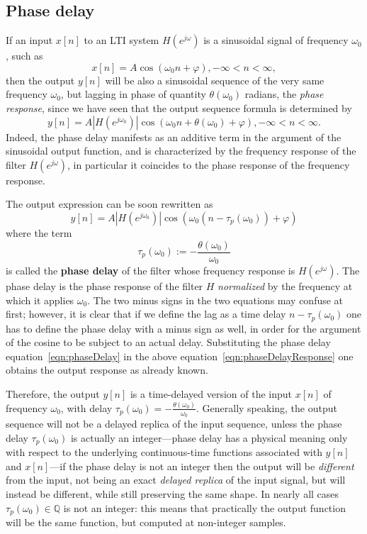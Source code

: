 \documentclass[\documentfontsize, twocolumn]{\classname}
\begin{document}
\subsection{Phase delay}

If an input $x[n]$ to an LTI system $H(e^{j\omega})$ is a sinusoidal signal of frequency $\omega_0$, such as
\[
    x[n] = A\cos{(\omega_0 n + \varphi)}, -\infty < n < \infty,
\]
then the output $y[n]$ will be also a sinusoidal sequence of the very same frequency $\omega_0$, but lagging in phase of quantity $\theta(\omega_0)$ radians, the \emph{phase response}, since we have seen that the output sequence formula is determined by
\[
    y[n] = A\left|H(e^{j\omega_0})\right| \cos{(\omega_0 n +\theta(\omega_0) + \varphi)}, -\infty < n < \infty.
\]
Indeed, the phase delay manifests as an additive term in the argument of the sinusoidal output function, and is characterized by the frequency response of the filter $H(e^{j\omega})$, in particular it coincides to the phase response of the frequency response.

The output expression can be soon rewritten as
\begin{equation}\label{eqn:phaseDelayResponse}
    y[n] = A\left|H(e^{j\omega_0})\right|\cos{\left(\omega_0\left(n - \tau_p(\omega_0)\right) + \varphi\right)}
\end{equation}
where the term
\begin{equation}\label{eqn:phaseDelay}
    \tau_p(\omega_0) :=
    -\frac {
        \theta(\omega_0)
    } {
        \omega_0
    }
\end{equation}
is called the \textbf{phase delay} of the filter whose frequency response is $H(e^{j\omega})$. The phase delay is the phase response of the filter $H$ \emph{normalized} by the frequency at which it applies $\omega_0$. The two minus signs in the two equations may confuse at first; however, it is clear that if we define the lag as a time delay $n - \tau_p(\omega_0)$ one has to define the phase delay with a minus sign as well, in order for the argument of the cosine to be subject to an actual delay. Substituting the phase delay equation~\ref{eqn:phaseDelay} in the above equation~\ref{eqn:phaseDelayResponse} one obtains the output response as already known.

Therefore, the output $y[n]$ is a time-delayed version of the input $x[n]$ of frequency $\omega_0$, with delay $\tau_p(\omega_0) =
    -\frac {
        \theta(\omega_0)
    } {
        \omega_0
    }$.
Generally speaking, the output sequence will not be a delayed replica of the input sequence, unless the phase delay $\tau_p(\omega_0)$ is actually an integer---phase delay has a physical meaning only with respect to the underlying continuous-time functions associated with $y[n]$ and $x[n]$---if the phase delay is not an integer then the output will be \emph{different} from the input, not being an exact \emph{delayed replica} of the input signal, but will instead be different, while still preserving the same shape. In nearly all cases $\tau_p(\omega_0) \in \mathbb{Q}$ is not an integer: this means that practically the output function will be the same function, but computed at non-integer samples.
\end{document}

